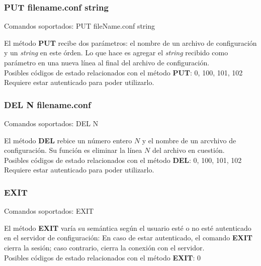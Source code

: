 \documentclass{beamer}
\begin{document}
\subsubsection{PUT filename.conf string}

\begin{frame}{Comandos soportados: PUT fileName.conf string}

\par El método \textbf{PUT} recibe dos parámetros: el nombre de un archivo de configuración y un \textit{string} en este órden. Lo que hace es agregar el \textit{string} recibido como parámetro en una nueva línea al final del archivo de configuración.\\[0.5cm]
Posibles códigos de estado relacionados con el método \textbf{PUT}: 0, 100, 101, 102
Requiere estar autenticado para poder utilizarlo.
\end{frame}

\subsubsection{DEL N filename.conf}

\begin{frame}{Comandos soportados: DEL N}

\par El método \textbf{DEL} rebice un número entero $N$ y el nombre de un arcvhivo de configuración. Su función es eliminar la línea $N$ del archivo en cuestión. \\[0.5cm]
 Posibles códigos de estado relacionados con el método \textbf{DEL}: 0, 100, 101, 102
 Requiere estar autenticado para poder utilizarlo.
\end{frame}

\subsubsection{EXIT}

\begin{frame}{Comandos soportados: EXIT}

\par El método \textbf{EXIT} varía su semántica según el usuario esté o no esté autenticado en el servidor de configuración: En caso de estar autenticado, el comando \textbf{EXIT} cierra la sesión; caso contrario, cierra la conexión con el servidor.\\[0.5cm]
Posibles códigos de estado relacionados con el método \textbf{EXIT}: 0
\end{frame}
\end{document}

